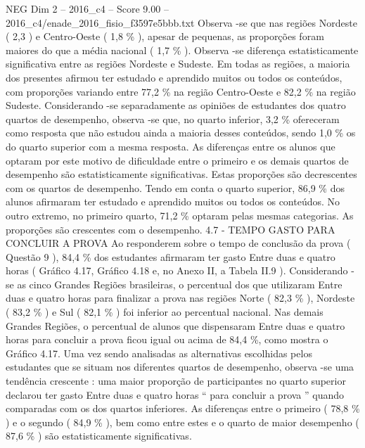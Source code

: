 \begin{textsample}{NEG Dim 2 – 2016\_c4 – Score 9.00 – 2016\_c4/enade\_2016\_fisio\_f3597e5bbb.txt}
Observa -se que nas regiões Nordeste ( 2,3 ) e Centro-Oeste ( 1,8 \% ), apesar de pequenas, as proporções foram maiores do que a média nacional ( 1,7 \% ).
Observa -se diferença estatisticamente significativa entre as regiões Nordeste e Sudeste.
Em todas as regiões, a maioria dos presentes afirmou ter estudado e aprendido muitos ou todos os conteúdos, com proporções variando entre 77,2 \% na região Centro-Oeste e 82,2 \% na região Sudeste.
Considerando -se separadamente as opiniões de estudantes dos quatro quartos de desempenho, observa -se que, no quarto inferior, 3,2 \% ofereceram como resposta que não estudou ainda a maioria desses conteúdos, sendo 1,0 \% os do quarto superior com a mesma resposta.
As diferenças entre os alunos que optaram por este motivo de dificuldade entre o primeiro e os demais quartos de desempenho são estatisticamente significativas.
Estas proporções são decrescentes com os quartos de desempenho.
Tendo em conta o quarto superior, 86,9 \% dos alunos afirmaram ter estudado e aprendido muitos ou todos os conteúdos.
No outro extremo, no primeiro quarto, 71,2 \% optaram pelas mesmas categorias.
As proporções são crescentes com o desempenho. 4.7 - TEMPO GASTO PARA CONCLUIR A PROVA Ao responderem sobre o tempo de conclusão da prova ( Questão 9 ), 84,4 \% dos estudantes afirmaram ter gasto Entre duas e quatro horas ( Gráfico 4.17, Gráfico 4.18 e, no Anexo II, a Tabela II.9 ).
Considerando -se as cinco Grandes Regiões brasileiras, o percentual dos que utilizaram Entre duas e quatro horas para finalizar a prova nas regiões Norte ( 82,3 \% ), Nordeste ( 83,2 \% ) e Sul ( 82,1 \% ) foi inferior ao percentual nacional.
Nas demais Grandes Regiões, o percentual de alunos que dispensaram Entre duas e quatro horas para concluir a prova ficou igual ou acima de 84,4 \%, como mostra o Gráfico 4.17.
Uma vez sendo analisadas as alternativas escolhidas pelos estudantes que se situam nos diferentes quartos de desempenho, observa -se uma tendência crescente : uma maior proporção de participantes no quarto superior declarou ter gasto Entre duas e quatro horas “ para concluir a prova ” quando comparadas com os dos quartos inferiores.
As diferenças entre o primeiro ( 78,8 \% ) e o segundo ( 84,9 \% ), bem como entre estes e o quarto de maior desempenho ( 87,6 \% ) são estatisticamente significativas.

\end{textsample}
